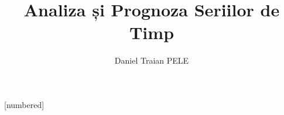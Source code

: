 \theoremstyle{definition}
[numbered]
\newtheorem{defn}{Definiție}
\newtheorem{thm}{Teoremă}
\newtheorem{prop}{Propoziție}
\newtheorem{rmk}{Observație}

\newenvironment{cminipage}[1]{%
    \par\noindent\hfill\begin{minipage}{#1}\ignorespaces
}{%
    \end{minipage}\hfill\null\par
}

\newcommand{\E}{\mathbb{E}}
\newcommand{\Var}{\text{Var}}
\newcommand{\Cov}{\text{Cov}}
\newcommand{\Corr}{\text{Corr}}
\newcommand{\R}{\mathbb{R}}
\newcommand{\N}{\mathbb{N}}
\newcommand{\Z}{\mathbb{Z}}
\newcommand{\B}{\mathbf{B}}
\newcommand{\imark}{\textcolor{MainBlue}{\textbullet}}
\newcommand{\RMSE}{\text{RMSE}}
\newcommand{\MAE}{\text{MAE}}
\newcommand{\MAPE}{\text{MAPE}}
\newcommand{\correct}{\textcolor{Forest}{\checkmark}}
\newcommand{\incorrect}{\textcolor{Crimson}{\texttimes}}

\newcommand{\bY}{\mathbf{Y}}
\newcommand{\bX}{\mathbf{X}}
\newcommand{\bA}{\mathbf{A}}
\newcommand{\bB}{\mathbf{B}}
\newcommand{\bepsilon}{\boldsymbol{\varepsilon}}
\newcommand{\bvarepsilon}{\boldsymbol{\varepsilon}}
\newcommand{\bSigma}{\boldsymbol{\Sigma}}
\newcommand{\bPhi}{\boldsymbol{\Phi}}
\newcommand{\bGamma}{\boldsymbol{\Gamma}}
\newcommand{\bPi}{\boldsymbol{\Pi}}
\newcommand{\bc}{\mathbf{c}}
\newcommand{\balpha}{\boldsymbol{\alpha}}
\newcommand{\bbeta}{\boldsymbol{\beta}}

\title[Analiza Seriilor de Timp]{Analiza și Prognoza Seriilor de Timp}
\author[D.T. Pele]{Daniel Traian PELE}
\date{}
